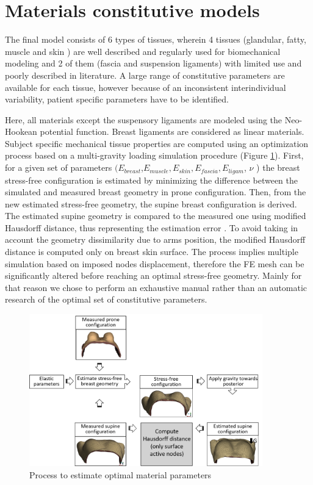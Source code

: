 \section{Materials constitutive models}
\label{section:myConstitutivModels}

The final model consists of 6 types of tissues, wherein 4 tissues (glandular, fatty, muscle and skin ) are well described and regularly used for biomechanical modeling and 2 of them (fascia and suspension ligaments) with limited use and poorly described in literature. A large range of constitutive parameters are available for each tissue, however because of an  inconsistent interindividual variability, patient specific parameters have to be identified.  


 Here, all materials except the suspensory ligaments are modeled using the Neo-Hookean potential function. Breast ligaments are considered as linear materials.  Subject specific mechanical tissue properties are computed using an optimization process based on a multi-gravity loading simulation procedure (Figure \ref{fig:optimizationalgo}). First, for a given set of parameters $(E_{breast}$,$ E_{muscle}, E_{skin}, E_{fascia}, E_{ligam}$, $\nu$ ) the breast stress-free configuration is estimated by minimizing the difference between the simulated and measured breast geometry in prone configuration. Then, from the new estimated stress-free geometry, the supine breast configuration is derived. The estimated supine geometry is compared to the measured one using modified Hausdorff distance, thus representing the estimation error .  To avoid taking in account the geometry dissimilarity due to arms position, the modified Hausdorff distance is computed only on breast skin surface.  
The process implies multiple simulation based on imposed nodes displacement, therefore the FE mesh can be significantly altered before reaching an optimal stress-free geometry. Mainly for that reason we chose to perform an exhaustive manual rather than an automatic research of the optimal set of constitutive parameters. 


\begin{figure}[!h]
\centering
\includegraphics[width=0.9\textwidth,keepaspectratio]{figures/optimizationMaterialParameters.png} 
\caption{Process to estimate optimal material parameters}\label{fig:optimizationalgo}
\end{figure}
 
